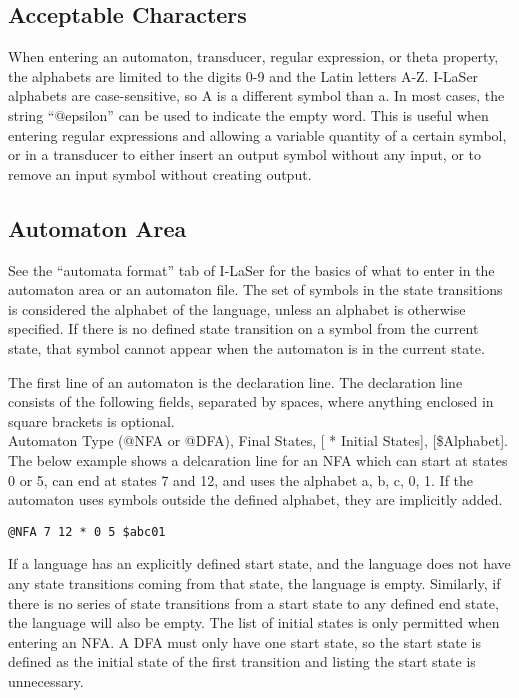 \documentclass{article}
\begin{document}
\subsection{Acceptable Characters}
When entering an automaton, transducer, regular expression, or theta property, the alphabets are limited to the digits 0-9 and the Latin letters A-Z.
I-LaSer alphabets are case-sensitive, so A is a different symbol than a.
In most cases, the string ``@epsilon'' can be used to indicate the empty word.
This is useful when entering regular expressions and allowing a variable quantity of a certain symbol, or in a transducer to either insert an output symbol without any input, or to remove an input symbol without creating output.

\subsection{Automaton Area}
See the ``automata format'' tab of I-LaSer for the basics of what to enter in the automaton area or an automaton file. The set of symbols in the state transitions is considered the alphabet of the language, unless an alphabet is otherwise specified. If there is no defined state transition on a symbol from the current state, that symbol cannot appear when the automaton is in the current state.
\par The first line of an automaton is the declaration line. The declaration line consists of the following fields, separated by spaces, where anything enclosed in square brackets is optional.\\
Automaton Type (@NFA or @DFA), Final States, [ * Initial States], [\$Alphabet].
The below example shows a delcaration line for an NFA which can start at states 0 or 5, can end at states 7 and 12, and uses the alphabet {a, b, c, 0, 1}.
If the automaton uses symbols outside the defined alphabet, they are implicitly added.
\begin{center}
\verb-@NFA 7 12 * 0 5 $abc01-
\end{center}
If a language has an explicitly defined start state, and the language does not have any state transitions coming from that state, the language is empty.
Similarly, if there is no series of state transitions from a start state to any defined end state, the language will also be empty.
The list of initial states is only permitted when entering an NFA.
A DFA must only have one start state, so the start state is defined as the initial state of the first transition and listing the start state is unnecessary.
\end{document}

